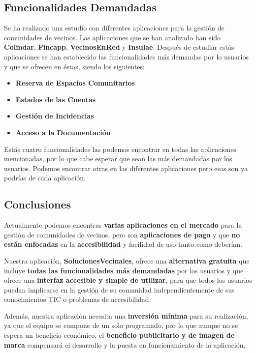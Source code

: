\subsection{Funcionalidades Demandadas}
Se ha realizado una estudio con diferentes aplicaciones para la gestión de comunidades de vecinos. Las aplicaciones que se han analizado han sido \textbf{Colindar}, \textbf{Fincapp}, \textbf{VecinosEnRed} y \textbf{Insulae}. Después de estudiar estás aplicaciones se han establecido las funcionalidades más demandas por lo usuarios y que se ofrecen en éstas, siendo los siguientes:

\begin{itemize}
	\item \textbf{Reserva de Espacios Comunitarios}
	\item \textbf{Estados de las Cuentas}
	\item \textbf{Gestión de Incidencias}
	\item \textbf{Acceso a la Documentación}
\end{itemize}

Estás cuatro funcionalidades las podemos encontrar en todas las aplicaciones mencionadas, por lo que cabe esperar que sean las más demandadas por los usuarios. Podemos encontrar otras en las diferentes aplicaciones pero esas son ya podrías de cada aplicación.

\subsection{Conclusiones}
Actualmente podemos encontrar \textbf{varias aplicaciones en el mercado} para la gestión de comunidades de vecinos, pero son \textbf{aplicaciones de pago} y que \textbf{no están enfocadas} en la \textbf{accesibilidad} y facilidad de uso tanto como deberían.

Nuestra aplicación, \textbf{SolucionesVecinales}, ofrece una \textbf{alternativa gratuita} que incluye \textbf{todas las funcionalidades más demandadas} por los usuarios y que ofrece una \textbf{interfaz accesible y simple de utilizar}, para que todos los usuarios puedan implicarse en la gestión de su comunidad independientemente de sus conocimientos TIC o problemas de accesibilidad.

Además, nuestra aplicación necesita una \textbf{inversión mínima} para su realización, ya que el equipo se compone de un solo programado, por lo que aunque no se espera un beneficio económico, el \textbf{beneficio publicitario y de imagen de marca} compensará el desarrollo y la puesta en funcionamiento de la aplicación.


